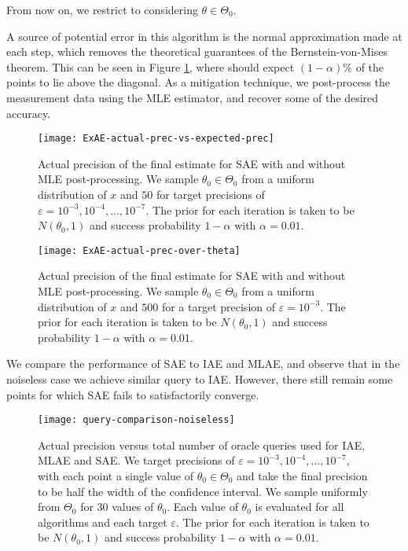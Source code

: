 From now on, we restrict to considering $\theta \in \Theta_0$. 

A source of potential error in this algorithm is the normal approximation made at each step, which removes the theoretical guarantees of the Bernstein-von-Mises theorem. This can be seen in Figure \ref{fig::ExAE-actual-prec-vs-expected-prec}, where should expect $(1-\alpha)\%$ of the points to lie above the diagonal. As a mitigation technique, we post-process the measurement data using the MLE estimator, and recover some of the desired accuracy.

\begin{figure}[htbp]
	\centering
	\texttt{[image: ExAE-actual-prec-vs-expected-prec]}
	\caption{Actual precision of the final estimate for SAE with and without MLE post-processing. We sample $\theta_0 \in \Theta_0$ from a uniform distribution of $x$ and $50$ for target precisions of $\varepsilon = 10^{-3}, 10^{-4}, \ldots, 10^{-7} $. The prior for each iteration is taken to be $N(\theta_0, 1)$ and success probability $1 - \alpha$ with $\alpha = 0.01$.}
	\label{fig::ExAE-actual-prec-vs-expected-prec}
\end{figure}

\begin{figure}[htbp]
	\centering
	\texttt{[image: ExAE-actual-prec-over-theta]}
	\caption{Actual precision of the final estimate for SAE with and without MLE post-processing. We sample $\theta_0 \in \Theta_0$ from a uniform distribution of $x$ and $500$ for a target precision of $\varepsilon = 10^{-3}$. The prior for each iteration is taken to be $N(\theta_0, 1)$ and success probability $1 - \alpha$ with $\alpha = 0.01$.}
	\label{fig::ExAE-actual-prec-over-theta}
\end{figure}

We compare the performance of SAE to IAE and MLAE, and observe that in the noiseless case we achieve similar query to IAE. However, there still remain some points for which SAE fails to satisfactorily converge.

\begin{figure}[htbp]
	\centering
	\texttt{[image: query-comparison-noiseless]}
	\caption{Actual precision versus total number of oracle queries used for IAE, MLAE and SAE. We target precisions of $\varepsilon = 10^{-3}, 10^{-4}, \ldots , 10^{-7}$, with each point a single value of $\theta_0 \in \Theta_0$ and take the final precision to be half the width of the confidence interval. We sample uniformly from $\Theta_0$ for 30 values of $\theta_0$. Each value of $\theta_0$ is evaluated for all algorithms and each target $\varepsilon$. The prior for each iteration is taken to be $N(\theta_0, 1)$ and success probability $1 - \alpha$ with $\alpha = 0.01$.}
	\label{fig::query-comparison-noiseless}
\end{figure}


